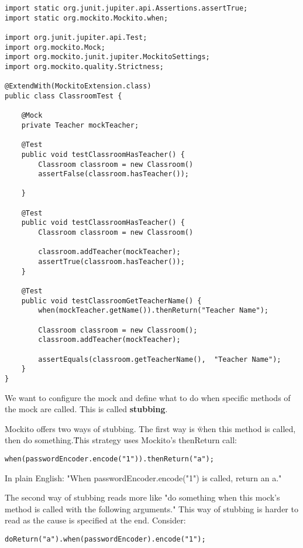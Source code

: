 \begin{lstlisting}
import static org.junit.jupiter.api.Assertions.assertTrue;
import static org.mockito.Mockito.when;

import org.junit.jupiter.api.Test;
import org.mockito.Mock;
import org.mockito.junit.jupiter.MockitoSettings;
import org.mockito.quality.Strictness;

@ExtendWith(MockitoExtension.class)
public class ClassroomTest {
    
    @Mock
    private Teacher mockTeacher;
    
    @Test
    public void testClassroomHasTeacher() {
        Classroom classroom = new Classroom()
        assertFalse(classroom.hasTeacher());
        
    }
    
    @Test
    public void testClassroomHasTeacher() {
        Classroom classroom = new Classroom()
        
        classroom.addTeacher(mockTeacher);
        assertTrue(classroom.hasTeacher());
    }
    
    @Test
    public void testClassroomGetTeacherName() {
        when(mockTeacher.getName()).thenReturn("Teacher Name");
        
        Classroom classroom = new Classroom();
        classroom.addTeacher(mockTeacher);
        
        assertEquals(classroom.getTeacherName(),  "Teacher Name");
    }
}
\end{lstlisting}

We want to configure the mock and define what to do when specific methods of the mock are called. This is called \textbf{stubbing}.

Mockito offers two ways of stubbing. The first way is \"when this method is called, then do something.\" This strategy uses Mockito's thenReturn call:

\begin{lstlisting}
when(passwordEncoder.encode("1")).thenReturn("a");
\end{lstlisting}

In plain English: "When passwordEncoder.encode("1") is called, return an a."

The second way of stubbing reads more like "do something when this mock’s method is called with the following arguments." This way of stubbing is harder to read as the cause is specified at the end. Consider:

\begin{lstlisting}
doReturn("a").when(passwordEncoder).encode("1");
\end{lstlisting}


